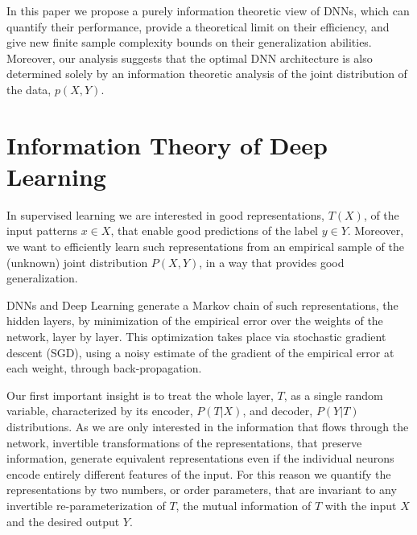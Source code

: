 \documentclass[11pt]{article}
\newcommand{\ignore}[1]{}
\begin{document}
{In this paper we propose a purely information theoretic view of DNNs, which can quantify their 
performance, provide a theoretical limit on their efficiency, 
and give new finite sample complexity bounds on their generalization abilities. Moreover, our analysis
suggests that the optimal DNN architecture is also determined solely by an information theoretic analysis 
of the joint distribution of the data, $p(X,Y)$.



\ignore{Here we propose using an explicit information theoretic compression of the relevant information, using the 
Information Bottleneck principle for learning the complete architecture and representations of the 
network in a principled way. It turns out that there is a direct connection between the linear separability
requirement and the relevant compression of the IB, which suggests that the DNN hidden layers correspond to 
the structural phase transitions obtained during the IB compression.}

}
\section{Information Theory of Deep Learning}
\label{Sec:DL-IT}
In supervised learning we are interested in good representations, $T(X)$, of the input patterns  $x\in X$, that enable good predictions of the label  $y \in Y$. Moreover, we want to efficiently learn such representations from an empirical sample of the (unknown) joint distribution $P(X,Y)$, in a way that provides good generalization.

DNNs and Deep Learning generate a Markov chain of such representations, the hidden layers, by minimization of the empirical error over the weights of the network, layer by layer. This optimization takes place via stochastic gradient descent (SGD), using a noisy estimate of the gradient of the empirical error at each weight, through back-propagation.  

Our first important insight is to treat the whole layer, $T$, as a single random variable, characterized by its encoder, $P(T|X)$, and decoder, $P(Y|T)$ distributions. As we are only interested in the information that flows through the network, invertible transformations of the representations, that preserve information, generate equivalent representations even if the individual neurons encode entirely different features of the input. For this reason we quantify the representations by two numbers, or order parameters, that are invariant to any invertible re-parameterization of $T$, the mutual information of $T$ with the input $X$ and the desired output $Y$.
\end{document}
